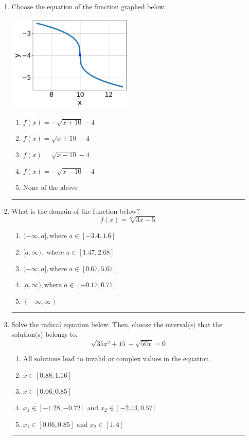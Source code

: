 \documentclass[14pt]{extbook}
\newcommand{\litem}[1]{\item#1\hspace*{-1cm}\rule{\textwidth}{0.4pt}}
\begin{document}
\begin{enumerate}
{\begin{enumerate}[label=\Alph*.]
\end{enumerate} }
\litem{
Choose the equation of the function graphed below.
\begin{center}
    \includegraphics[width=0.5\textwidth]{../Figures/radicalGraphToEquationCopyA.png}
\end{center}
\begin{enumerate}[label=\Alph*.]
\item \( f(x) = - \sqrt{x + 10} - 4 \)
\item \( f(x) = \sqrt{x + 10} - 4 \)
\item \( f(x) = \sqrt{x - 10} - 4 \)
\item \( f(x) = - \sqrt{x - 10} - 4 \)
\item \( \text{None of the above} \)

\end{enumerate} }
\litem{
What is the domain of the function below?\[ f(x) = \sqrt[6]{3 x - 5} \]\begin{enumerate}[label=\Alph*.]
\item \( (-\infty, a], \text{where } a \in [-3.4, 1.6] \)
\item \( [a, \infty), \text{ where } a \in [1.47, 2.68] \)
\item \( (-\infty, a], \text{where } a \in [0.67, 5.67] \)
\item \( [a, \infty), \text{where } a \in [-0.17, 0.77] \)
\item \( (-\infty, \infty) \)

\end{enumerate} }
\litem{
Solve the radical equation below. Then, choose the interval(s) that the solution(s) belongs to.\[ \sqrt{35 x^2 + 15} - \sqrt{50 x} = 0 \]\begin{enumerate}[label=\Alph*.]
\item \( \text{All solutions lead to invalid or complex values in the equation.} \)
\item \( x \in [0.88,1.16] \)
\item \( x \in [0.06,0.85] \)
\item \( x_1 \in [-1.28, -0.72] \text{ and } x_2 \in [-2.43,0.57] \)
\item \( x_1 \in [0.06, 0.85] \text{ and } x_2 \in [1,4] \)


\end{enumerate}}
\end{enumerate}
\end{document}
